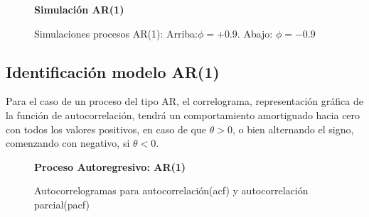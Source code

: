 \begin{figure}[H]
	\centering
	\textbf{Simulación AR(1)}\par\medskip
	\caption{Simulaciones procesos AR(1): Arriba:$\phi=+0.9$.  Abajo: $\phi=-0.9$}\label{fig6}
\end{figure}


\subsection{Identificaci\'on modelo AR(1)}

Para el caso de un proceso del tipo AR, el correlograma, representaci\'on gr\'afica de la funci\'on de autocorrelaci\'on, tendr\'a un
comportamiento amortiguado hacia cero con todos los valores positivos, en caso de que $\theta > 0$, o bien alternando el signo, comenzando con negativo, si  $\theta < 0$.

\begin{figure}[H]
	\centering
	\textbf{Proceso Autoregresivo: AR(1)}\par\medskip
	\caption{Autocorrelogramas para autocorrelación(acf) y autocorrelación parcial(pacf)}\label{fig7}
\end{figure}


